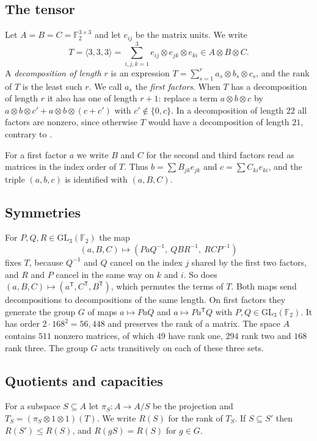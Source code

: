 \documentclass[11pt]{amsart}
\theoremstyle{definition}
\theoremstyle{remark}
\numberwithin{equation}{section}
\newcommand{\F}{\mathbb{F}_2}
\newcommand{\GL}{\mathrm{GL}_3(\F)}
\newcommand{\mm}{\langle 3,3,3\rangle}
\begin{document}
\subsection{The tensor}
Let $A=B=C=\F^{3\times 3}$ and let $e_{ij}$ be the matrix units. We write
\[
T=\mm=\sum_{i,j,k=1}^{3} e_{ij}\otimes e_{jk}\otimes e_{ki}\in A\otimes B\otimes C .
\]
A \emph{decomposition of length $r$} is an expression $T=\sum_{s=1}^{r}a_s\otimes b_s\otimes c_s$, and the rank of $T$ is the least such $r$. We call $a_s$ the \emph{first factors}. When $T$ has a decomposition of length $r$ it also has one of length $r+1$: replace a term $a\otimes b\otimes c$ by $a\otimes b\otimes c'+a\otimes b\otimes(c+c')$ with $c'\notin\{0,c\}$. In a decomposition of length $22$ all factors are nonzero, since otherwise $T$ would have a decomposition of length $21$, contrary to \cite{RR26}.

For a first factor $a$ we write $B$ and $C$ for the second and third factors read as matrices in the index order of $T$. Thus $b=\sum B_{jk}e_{jk}$ and $c=\sum C_{ki}e_{ki}$, and the triple $(a,b,c)$ is identified with $(a,B,C)$.

\subsection{Symmetries}
For $P,Q,R\in\GL$ the map
\begin{equation}\label{eq:sym}
(a,B,C)\mapsto (PaQ^{-1},\ QBR^{-1},\ RCP^{-1})
\end{equation}
fixes $T$, because $Q^{-1}$ and $Q$ cancel on the index $j$ shared by the first two factors, and $R$ and $P$ cancel in the same way on $k$ and $i$. So does $(a,B,C)\mapsto(a^{\mathsf T},C^{\mathsf T},B^{\mathsf T})$, which permutes the terms of $T$. Both maps send decompositions to decompositions of the same length. On first factors they generate the group $G$ of maps $a\mapsto PaQ$ and $a\mapsto Pa^{\mathsf T}Q$ with $P,Q\in\GL$. It has order $2\cdot 168^2=56{,}448$ and preserves the rank of a matrix. The space $A$ contains $511$ nonzero matrices, of which $49$ have rank one, $294$ rank two and $168$ rank three. The group $G$ acts transitively on each of these three sets.

\subsection{Quotients and capacities}\label{subsec:quot}
For a subspace $S\subseteq A$ let $\pi_S\colon A\to A/S$ be the projection and $T_S=(\pi_S\otimes 1\otimes 1)(T)$. We write $R(S)$ for the rank of $T_S$. If $S\subseteq S'$ then $R(S')\le R(S)$, and $R(gS)=R(S)$ for $g\in G$.
\end{document}
